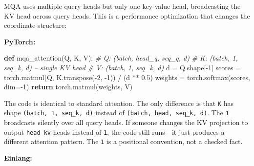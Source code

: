 \documentclass[11pt,titlepage]{article}
\newenvironment{Shaded}{}{}
\newcommand{\CommentTok}[1]{\textcolor[rgb]{0.38,0.63,0.69}{\textit{#1}}}
\newcommand{\ControlFlowTok}[1]{\textcolor[rgb]{0.00,0.44,0.13}{\textbf{#1}}}
\newcommand{\DecValTok}[1]{\textcolor[rgb]{0.25,0.63,0.44}{#1}}
\newcommand{\FloatTok}[1]{\textcolor[rgb]{0.25,0.63,0.44}{#1}}
\newcommand{\KeywordTok}[1]{\textcolor[rgb]{0.00,0.44,0.13}{\textbf{#1}}}
\newcommand{\NormalTok}[1]{#1}
\newcommand{\OperatorTok}[1]{\textcolor[rgb]{0.40,0.40,0.40}{#1}}
\begin{document}
MQA uses multiple query heads but only one key-value head, broadcasting
the KV head across query heads. This is a performance optimization that
changes the coordinate structure:

\textbf{PyTorch:}

\begin{Shaded}
\begin{Highlighting}[]
\KeywordTok{def}\NormalTok{ mqa_attention(Q, K, V):}
    \CommentTok{# Q: (batch, head_q, seq_q, d)}
    \CommentTok{# K: (batch, 1, seq_k, d)      -- single KV head}
    \CommentTok{# V: (batch, 1, seq_k, d)}
\NormalTok{    d }\OperatorTok{=}\NormalTok{ Q.shape[}\OperatorTok{-}\DecValTok{1}\NormalTok{]}
\NormalTok{    scores }\OperatorTok{=}\NormalTok{ torch.matmul(Q, K.transpose(}\OperatorTok{-}\DecValTok{2}\NormalTok{, }\DecValTok{-1}\NormalTok{)) }\OperatorTok{/}\NormalTok{ (d }\OperatorTok{**} \FloatTok{0.5}\NormalTok{)}
\NormalTok{    weights }\OperatorTok{=}\NormalTok{ torch.softmax(scores, dim}\OperatorTok{=-}\DecValTok{1}\NormalTok{)}
    \ControlFlowTok{return}\NormalTok{ torch.matmul(weights, V)}
\end{Highlighting}
\end{Shaded}

The code is identical to standard attention. The only difference is that
\texttt{K} has shape \texttt{(batch,\ 1,\ seq\_k,\ d)} instead of
\texttt{(batch,\ head,\ seq\_k,\ d)}. The \texttt{1} broadcasts silently
over all query heads. If someone changes the KV projection to output
\texttt{head\_kv} heads instead of \texttt{1}, the code still runs---it
just produces a different attention pattern. The \texttt{1} is a
positional convention, not a checked fact.

\textbf{Einlang:}
\end{document}
